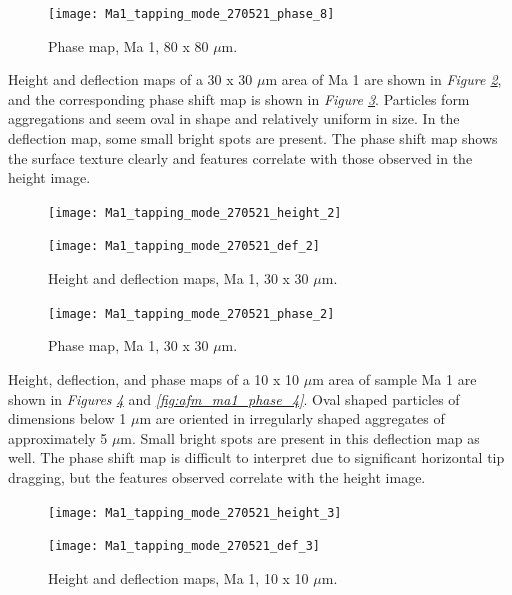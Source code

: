 \begin{figure}[H]
\centering
  \texttt{[image: Ma1\_tapping\_mode\_270521\_phase\_8]}
\caption[Phase map, Ma 1]{Phase map, Ma 1, 80 x 80 $\mu$m.}
\label{fig:afm_ma1_phase_2}
\end{figure}


Height and deflection maps of a 30 x 30 $\mu$m area of Ma 1 are shown in \textit{Figure \ref{fig:afm_ma1_height_def_3}}, and the corresponding phase shift map is shown in \textit{Figure \ref{fig:afm_ma1_phase_3}}. Particles form aggregations and seem oval in shape and relatively uniform in size. In the deflection map, some small bright spots are present. The phase shift map shows the surface texture clearly and features correlate with those observed in the height image.


\begin{figure}[H]
\centering
\begin{minipage}{.45\textwidth}
  \centering
  \texttt{[image: Ma1\_tapping\_mode\_270521\_height\_2]}
\end{minipage}
\begin{minipage}{.45\textwidth}
  \centering
  \texttt{[image: Ma1\_tapping\_mode\_270521\_def\_2]}
\end{minipage}
\caption[Height and deflection maps, Ma 1]{Height and deflection maps, Ma 1, 30 x 30 $\mu$m.}
\label{fig:afm_ma1_height_def_3}
\end{figure}

\begin{figure}[H]
\centering
  \texttt{[image: Ma1\_tapping\_mode\_270521\_phase\_2]}
\caption[Phase map, Ma 1]{Phase map, Ma 1, 30 x 30 $\mu$m.}
\label{fig:afm_ma1_phase_3}
\end{figure}

Height, deflection, and phase maps of a 10 x 10 $\mu$m area of sample Ma 1 are shown in \textit{Figures \ref{fig:afm_ma1_height_def_4}} and \textit{\ref{fig:afm_ma1_phase_4}}. Oval shaped particles of dimensions below 1 $\mu$m are oriented in irregularly shaped aggregates of approximately 5 $\mu$m. Small bright spots are present in this deflection map as well. The phase shift map is difficult to interpret due to significant horizontal tip dragging, but the features observed correlate with the height image.

\begin{figure}[H]
\centering
\begin{minipage}{.45\textwidth}
  \centering
  \texttt{[image: Ma1\_tapping\_mode\_270521\_height\_3]}
\end{minipage}
\begin{minipage}{.45\textwidth}
  \centering
  \texttt{[image: Ma1\_tapping\_mode\_270521\_def\_3]}
\end{minipage}
\caption[Height and deflection maps, Ma 1]{Height and deflection maps, Ma 1, 10 x 10 $\mu$m.}
\label{fig:afm_ma1_height_def_4}
\end{figure}

